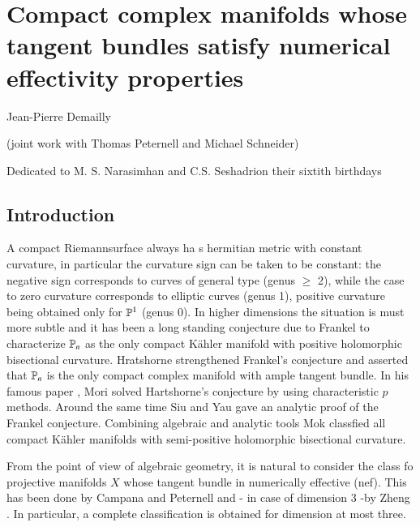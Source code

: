 \chapter{Compact complex manifolds whose tangent bundles satisfy numerical effectivity properties}\label{chap5}


\begin{center}
Jean-Pierre Demailly

\smallskip
(joint work with Thomas Peternell and Michael Schneider)

\medskip
Dedicated to M. S. Narasimhan and C.S. Seshadri\break on their sixtith birthdays
\end{center}

\setcounter{pageoriginal}{66}
\setcounter{section}{-1}
\section{Introduction}\label{chap5-sec-0}
A compact Riemann\pageoriginale surface always ha s hermitian metric with constant curvature, in particular the curvature sign can be taken to be constant: the negative sign corresponds to curves of general type (genus $\geq$ 2), while the case to zero curvature corresponds to elliptic curves (genus 1), positive curvature being obtained only for $\mathbb{P}^{1}$ (genus 0). In higher dimensions the situation is must more subtle and it has been a long standing conjecture due to Frankel to characterize $\mathbb{P}_{n}$ as the only compact K\"ahler manifold with positive holomorphic bisectional curvature. Hratshorne strengthened Frankel's conjecture and asserted that $\mathbb{P}_{n}$ is the only compact complex manifold with ample tangent bundle. In his famous paper \cite{chap5-keyMo79}, Mori solved Hartshorne's conjecture by using characteristic $p$ methods. Around the same time Siu and Yau \cite{chap5-keySY80} gave an analytic proof of the Frankel conjecture. Combining algebraic and analytic tools Mok \cite{chap5-keyMk88} classfied all compact K\"ahler manifolds with semi-positive holomorphic bisectional curvature. 

From the point of view of algebraic geometry, it is natural to consider the class fo projective manifolds $X$ whose tangent bundle in numerically effective (nef). This has been done by Campana and Peternell \cite{chap5-keyCP91} and - in case of dimension 3 -by Zheng \cite{chap5-keyZh90}. In particular, a complete classification is obtained for dimension at most three.

